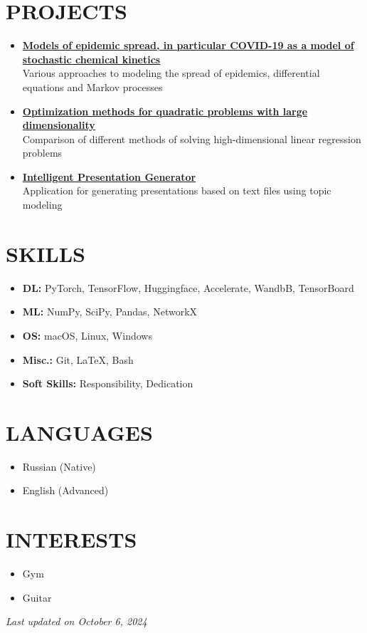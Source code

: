 \documentclass[11pt,a4paper]{moderncv}
\begin{document}
\section{PROJECTS}
\begin{itemize}
    \item \href{https://github.com/kisnikser/Epidemic-Spread-Models}{\textbf{Models of epidemic spread, in particular COVID-19 as a model of stochastic chemical kinetics}}\\
    Various approaches to modeling the spread of epidemics, differential equations and Markov processes
    \item \href{https://github.com/kisnikser/Optimization-Methods}{\textbf{Optimization methods for quadratic problems with large dimensionality}}\\
    Comparison of different methods of solving high-dimensional linear regression problems
    \item \href{https://github.com/kisnikser/Intelligent-Presentation-Generator}{\textbf{Intelligent Presentation Generator}}\\
    Application for generating presentations based on text files using topic modeling
\end{itemize}

\section{SKILLS}
\begin{itemize}
    \item \textbf{DL:} PyTorch, TensorFlow, Huggingface, Accelerate, WandbB, TensorBoard
    \item \textbf{ML:} NumPy, SciPy, Pandas, NetworkX
    \item \textbf{OS:} macOS, Linux, Windows
    \item \textbf{Misc.:} Git, \LaTeX, Bash
    \item \textbf{Soft Skills:} Responsibility, Dedication
\end{itemize}

\section{LANGUAGES}
\begin{itemize}
    \item Russian (Native)
    \item English (Advanced)
\end{itemize}

\section{INTERESTS}
\begin{itemize}
    \item Gym
    \item Guitar
\end{itemize}

\vspace{\fill}
\begin{center}
\textit{Last updated on October 6, 2024}
\end{center}
\vspace{-3.0cm}
\end{document}
